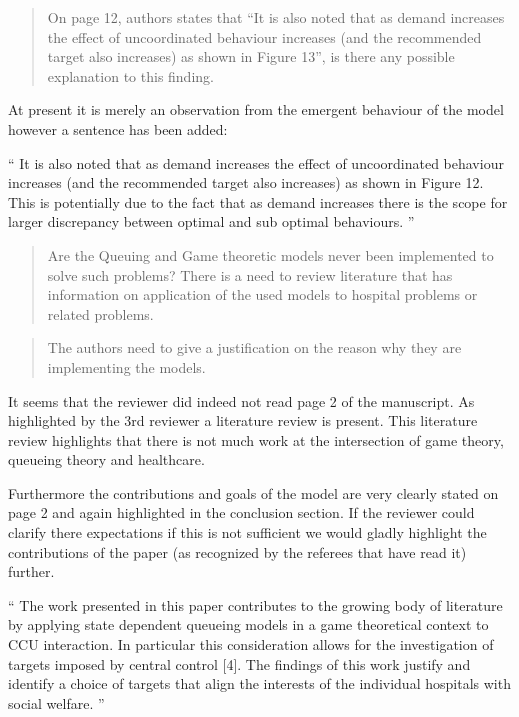 \documentclass{article}
\begin{document}
\begin{quote}
    \begin{textit}{
    On page 12, authors states that ``It is also noted that as demand increases the effect of uncoordinated behaviour increases (and the recommended target also increases) as shown in Figure 13'', is there any possible explanation to this finding.
    }\end{textit}
\end{quote}

At present it is merely an observation from the emergent behaviour of the model however a sentence has been added:

``
It is also noted that as demand increases the effect of uncoordinated behaviour increases (and the recommended target also increases) as shown in Figure 12. This is potentially due to the fact that as demand increases there is the scope for larger discrepancy between optimal and sub optimal behaviours.
''

\begin{quote}
    \begin{textit}{
    Are the Queuing and Game theoretic models never been implemented to solve such problems? There is a need to review literature that has information on application of the used models to hospital problems or related problems.
    }\end{textit}
\end{quote}

\begin{quote}
    \begin{textit}{
The authors need to give a justification on the reason why they are implementing the models.
    }\end{textit}
\end{quote}

It seems that the reviewer did indeed not read page 2 of the manuscript. As
highlighted by the 3rd reviewer a literature review is present. This literature
review highlights that there is not much work at the intersection of game
theory, queueing theory and healthcare.

Furthermore the contributions and goals of the model are very clearly stated on
page 2 and again highlighted in the conclusion section. If the reviewer could
clarify there expectations if this is not sufficient we would gladly highlight
the contributions of the paper (as recognized by the referees that have read it)
further.

``
The work presented in this paper contributes to the growing body of literature
by applying state dependent queueing models in a game theoretical context to CCU
interaction.  In particular this consideration allows for the investigation of
targets imposed by central control [4].  The findings of this work justify and
identify a choice of targets that align the interests of the individual
hospitals with social welfare.
''
\end{document}
